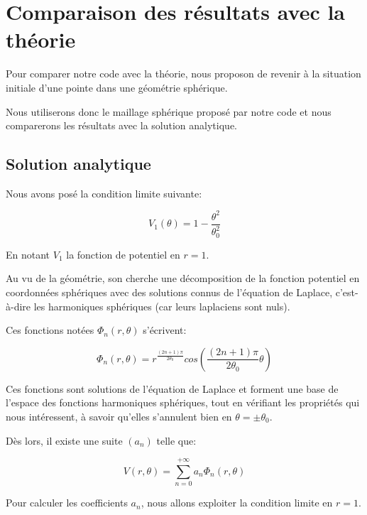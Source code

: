 \documentclass{article}
\begin{document}
\newpage

\section{Comparaison des résultats avec la théorie}

Pour comparer notre code avec la théorie,
nous proposon de revenir à la situation initiale
d'une pointe dans une géométrie sphérique.

Nous utiliserons donc le maillage sphérique proposé
par notre code et nous comparerons les résultats
avec la solution analytique.

\subsection{Solution analytique}

Nous avons posé la condition limite suivante:

\begin{equation}
    V_1(\theta) = 1 - \frac{\theta^2}{\theta_0^2}
\end{equation}

En notant $V_1$ la fonction de potentiel en $r=1$.

Au vu de la géométrie, son cherche une décomposition
de la fonction potentiel en coordonnées sphériques
avec des solutions connus de l'équation de Laplace,
c'est-à-dire les harmoniques sphériques (car leurs
laplaciens sont nuls).

Ces fonctions notées $\Phi_n(r, \theta)$ s'écrivent:

\begin{equation}
    \Phi_n(r, \theta) =
    r^{\frac{(2n+1)\pi}{2 \theta_0}}
    cos\left(\frac{(2n+1)\pi}{2\theta_0}\theta\right)
\end{equation}

Ces fonctions sont solutions de l'équation de Laplace
et forment une base de l'espace des fonctions harmoniques
sphériques, tout en vérifiant les propriétés qui
nous intéressent, à savoir qu'elles s'annulent bien
en $\theta = \pm \theta_0$.

Dès lors, il existe une suite $(a_n)$ telle que:

\begin{equation}
    V(r,\theta) = \sum_{n=0}^{+\infty} a_n \Phi_n(r, \theta)
\end{equation}

Pour calculer les coefficients $a_n$, nous allons exploiter
la condition limite en $r=1$.
\end{document}
